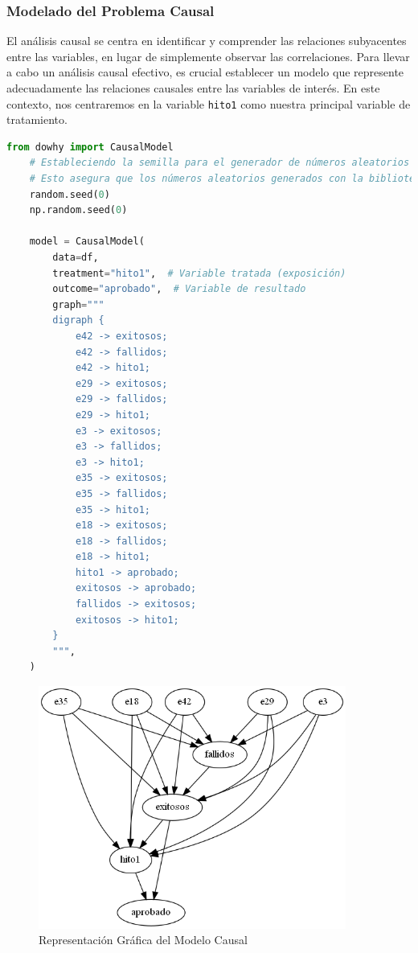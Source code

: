 \subsubsection{Modelado del Problema Causal}

El análisis causal se centra en identificar y comprender las relaciones subyacentes entre las variables, en lugar de simplemente observar las correlaciones. Para llevar a cabo un análisis causal efectivo, es crucial establecer un modelo que represente adecuadamente las relaciones causales entre las variables de interés. En este contexto, nos centraremos en la variable \texttt{hito1} como nuestra principal variable de tratamiento.

\begin{lstlisting}[language=Python, caption=Construcción del Modelo Causal para hito1, label=lst:model_causalHito1]
    from dowhy import CausalModel
    # Estableciendo la semilla para el generador de números aleatorios de la biblioteca 'random' en Python.
    # Esto asegura que los números aleatorios generados con la biblioteca 'random' serán reproducibles en cada ejecución.
    random.seed(0)
    np.random.seed(0)
    
    model = CausalModel(
        data=df,
        treatment="hito1",  # Variable tratada (exposición)
        outcome="aprobado",  # Variable de resultado
        graph="""
        digraph {
            e42 -> exitosos;
            e42 -> fallidos;
            e42 -> hito1;
            e29 -> exitosos;
            e29 -> fallidos;
            e29 -> hito1;
            e3 -> exitosos;
            e3 -> fallidos;
            e3 -> hito1;
            e35 -> exitosos;
            e35 -> fallidos;
            e35 -> hito1;
            e18 -> exitosos;
            e18 -> fallidos;
            e18 -> hito1;
            hito1 -> aprobado;
            exitosos -> aprobado;
            fallidos -> exitosos;
            exitosos -> hito1;
        }
        """,
    )
\end{lstlisting}


\begin{figure}[H]
        \centering
        \includegraphics[width=0.9\textwidth]{img/causalidad/graph_causal_model_hito1.png}
        \caption{Representación Gráfica del Modelo Causal}
        \label{fig:modelo_causal_hito1}

\end{figure}

